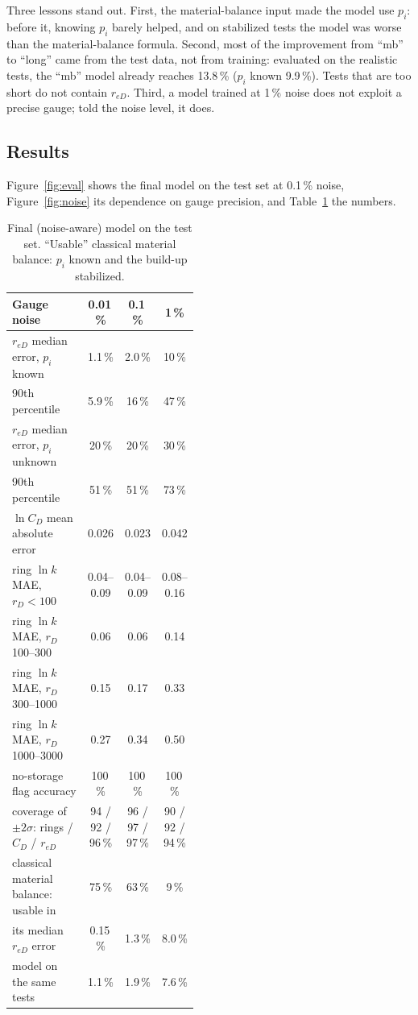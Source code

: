 \documentclass[11pt]{article}
\newcommand{\reD}{r_{eD}}
\begin{document}
Three lessons stand out. First, the material-balance input made the model use $p_i$: before it, knowing $p_i$ barely
helped, and on stabilized tests the model was worse than the material-balance formula. Second, most of the
improvement from ``mb'' to ``long'' came from the test data, not from training: evaluated on the realistic tests,
the ``mb'' model already reaches 13.8\,\% ($p_i$ known 9.9\,\%). Tests that are too short do not contain $\reD$.
Third, a model trained at 1\,\% noise does not exploit a precise gauge; told the noise level, it does.

\subsection{Results}

Figure~\ref{fig:eval} shows the final model on the test set at 0.1\,\% noise, Figure~\ref{fig:noise} its dependence
on gauge precision, and Table~\ref{tab:final} the numbers.

\begin{table}[h]
  \centering
  \small
  \begin{tabular}{@{}p{0.46\linewidth}ccc@{}}
    \toprule
    Gauge noise & 0.01\,\% & 0.1\,\% & 1\,\% \\
    \midrule
    $\reD$ median error, $p_i$ known & 1.1\,\% & 2.0\,\% & 10\,\% \\
    \quad 90th percentile & 5.9\,\% & 16\,\% & 47\,\% \\
    $\reD$ median error, $p_i$ unknown & 20\,\% & 20\,\% & 30\,\% \\
    \quad 90th percentile & 51\,\% & 51\,\% & 73\,\% \\
    $\ln C_D$ mean absolute error & 0.026 & 0.023 & 0.042 \\
    ring $\ln k$ MAE, $r_D < 100$ & 0.04--0.09 & 0.04--0.09 & 0.08--0.16 \\
    ring $\ln k$ MAE, $r_D$ 100--300 & 0.06 & 0.06 & 0.14 \\
    ring $\ln k$ MAE, $r_D$ 300--1000 & 0.15 & 0.17 & 0.33 \\
    ring $\ln k$ MAE, $r_D$ 1000--3000 & 0.27 & 0.34 & 0.50 \\
    no-storage flag accuracy & 100\,\% & 100\,\% & 100\,\% \\
    coverage of $\pm2\sigma$: rings / $C_D$ / $\reD$ & 94 / 92 / 96\,\% & 96 / 97 / 97\,\% & 90 / 92 / 94\,\% \\
    classical material balance: usable in & 75\,\% & 63\,\% & 9\,\% \\
    \quad its median $\reD$ error & 0.15\,\% & 1.3\,\% & 8.0\,\% \\
    \quad model on the same tests & 1.1\,\% & 1.9\,\% & 7.6\,\% \\
    \bottomrule
  \end{tabular}
  \caption{Final (noise-aware) model on the test set. ``Usable'' classical material balance: $p_i$ known and the
  build-up stabilized.}
  \label{tab:final}
\end{table}
\end{document}
